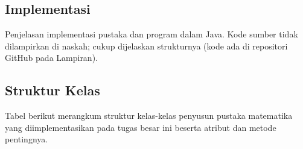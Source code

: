 \documentclass[12pt]{article}
\newif\ifbonusinpainting  \bonusinpaintingfalse
\begin{document}
\begin{enumerate}
\ifbonusinpainting
\subsection{Image Inpainting dengan Persamaan Laplace}
\textit{Image inpainting} bertujuan merekonstruksi piksel citra yang rusak/hilang pada domain $\Omega$ berdasarkan informasi piksel utuh pada batas wilayah $\partial\Omega$. Daerah yang hilang dimodelkan memenuhi Persamaan Laplace kontinu $\nabla^2 f = 0$.

Menggunakan pendekatan skema beda hingga pusat (*center finite difference*), diskritisasi Persamaan Laplace pada piksel $(i, j)$ dinyatakan sebagai rata-rata dari empat piksel tetangganya:
\begin{equation}
    f_{i,j} = \frac{f_{i+1,j} + f_{i-1,j} + f_{i,j+1} + f_{i,j-1}}{4}
\end{equation}
Formulasi ini membentuk Sistem Persamaan Linier berukuran besar $N \times N$ (di mana $N$ adalah jumlah piksel rusak). Untuk menyelesaikan SPL berukuran sangat besar tersebut secara efisien, digunakan metode iteratif **Jacobi** atau **Gauss-Seidel**. Skema pembaruan metode Gauss-Seidel pada iterasi ke-$(k+1)$ dirumuskan sebagai:
\begin{equation}
    f_{i,j}^{(k+1)} = \frac{f_{i-1,j}^{(k+1)} + f_{i+1,j}^{(k)} + f_{i,j-1}^{(k+1)} + f_{i,j+1}^{(k)}}{4}
\end{equation}
Proses iterasi dilanjutkan hingga mencapai kriteria konvergensi $\|f^{(k+1)} - f^{(k)}\| < \varepsilon$.
\fi

\section{Implementasi}
Penjelasan implementasi pustaka dan program dalam Java. Kode sumber tidak
dilampirkan di naskah; cukup dijelaskan strukturnya (kode ada di repositori
GitHub pada Lampiran).

\subsection{Struktur Kelas}
Tabel berikut merangkum struktur kelas-kelas penyusun pustaka matematika yang diimplementasikan pada tugas besar ini beserta atribut dan metode pentingnya.


\end{enumerate}
\end{document}
